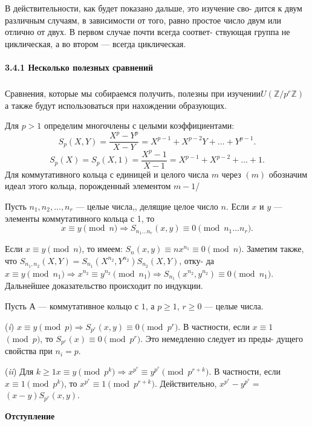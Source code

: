 \documentclass{../template/mai_book}
\begin{document}
В действительности, как будет показано дальше, это изучение сво-\linebreak­
дится к двум различным случаям, в зависимости от того, равно простое\linebreak
число двум или отлично от двух. В первом случае почти всегда соответ­-\linebreak
ствующая группа не циклическая, а во втором — всегда циклическая.\linebreak
\paragraph{3.4.1 Несколько полезных сравнений}
\subparagraph{}
Сравнения, которые мы собираемся получить, полезны при изучении\linebreak $U(\mathbb{Z}/p^r\mathbb{Z})$
а также будут использоваться при нахождении образующих.

Для $p>1$ определим многочлены с целыми коэффициентами:
$$S_p(X, Y) = \frac{X^p - Y^p}{X - Y}=X^{p-1}+X^{p-2}Y+...+Y^{p-1}.$$
$$S_p(X) = S_p(X, 1) = \frac{X^p - 1}{X - 1} = X^{p-1} + X^{p - 2} + ... + 1.$$
Для коммутативного кольца с единицей и целого числа $m$ через $(m)$\linebreak
обозначим идеал этого кольца, порожденный элементом $m - 1$/
\begin{property}
Пусть $n_1, n_2,...,n_r$ — целые числа,, делящие целое число $n$. Если $x$\linebreak
и $y$ — элементы коммутативного кольца с 1, то
$$x \equiv y\pmod{n}\Rightarrow S_{n_1...n_r}(x,y) \equiv 0 \pmod{n_1...n_r}.$$
\end{property}
\begin{myproof}
Если $x \equiv y \pmod{n}$, то имеем: $S_n(x, y) \equiv nx^{n _ 1} \equiv 0 \pmod {n}$.\linebreak
Заметим также, что $S_{n_1,n_2}(X,Y) = S_{n_1}(X^{n_2}, Y^{n_2})S_{n_2}(X,Y)$, отку-\linebreak­
да $x \equiv y \pmod{n_1} \Rightarrow x^{n_2} \equiv y^{n_2} \pmod{n_1} \Rightarrow S_{n_1}(x^{n_2},y^{n_2}) \equiv 0$\linebreak $\pmod{n_1}$. Дальнейшее доказательство происходит по индукции.
\end{myproof}
\begin{sled}
Пусть А --- коммутативное кольцо с $1$, а $p \ge 
1$, $r \ge 0$ — целые числа.
 
\par  (\textit{i}) $x \equiv y \pmod{p} \Rightarrow S_{p^r}(x,y) \equiv 0 \pmod{p^r}$. В частности, если $x \equiv 1$\linebreak
 $\pmod{p}$, то $S_{p^r}(x)\equiv 0 \pmod{p^r}$. Это немедленно следует из преды-\linebreak
дущего свойства при $n_i = p$.
\newpage
\par  (\textit{ii}) Для $k \ge 1 x \equiv y \pmod{p^k} \Rightarrow x^{p^r} \equiv y^{p^r} \pmod{p^{r+k}}$. В частности,\linebreak
если $x \equiv 1 \pmod{p^k}$, то $x^{p^r}\equiv 1 \pmod{p^{r+k}}$. Действительно, $x^{p^r} - y^{p^r} = $\linebreak$(x - y)S_{p^r}(x,y)$.
\end{sled}
\noindent\textbf{Отступление}
\end{document}
